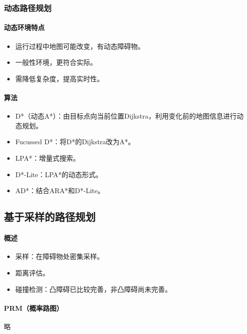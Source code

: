 \documentclass[
12pt, %
a4paper, 
oneside, %
]{scrartcl}
\begin{document}
\subsubsection[动态路径规划]{动态路径规划}
\paragraph{动态环境特点}
\begin{itemize}
\item 运行过程中地图可能改变，有动态障碍物。
\item 一般性环境，更符合实际。
\item 需降低复杂度，提高实时性。
\end{itemize}
\paragraph{算法}
\begin{itemize}
\item D*（动态A*）：由目标点向当前位置Dijkstra，利用变化前的地图信息进行动态规划。
\item Fucussed D*：将D*的Dijkstra改为A*。
\item LPA*：增量式搜索。
\item D*-Lite：LPA*的动态形式。
\item AD*：结合ARA*和D*-Lite。
\end{itemize}
\subsection[基于采样的路径规划]{基于采样的路径规划}
\paragraph{概述}
\begin{itemize}
\item 采样：在障碍物处密集采样。
\item 距离评估。
\item 碰撞检测：凸障碍已比较完善，非凸障碍尚未完善。
\end{itemize}
\paragraph{PRM（概率路图）}
略
\end{document}
